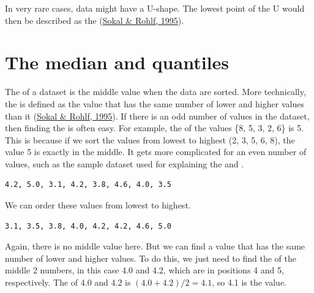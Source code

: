 \documentclass[
  openany]{krantz}
\begin{document}
In very rare cases, data might have a U-shape.
The lowest point of the U would then be described as the  (\protect\hyperlink{ref-Sokal1995}{Sokal \& Rohlf, 1995}).

\hypertarget{the-median-and-quantiles}{%
\section{The median and quantiles}\label{the-median-and-quantiles}}

The  of a dataset is the middle value when the data are sorted.
More technically, the  is defined as the value that has the same number of lower and higher values than it (\protect\hyperlink{ref-Sokal1995}{Sokal \& Rohlf, 1995}).
If there is an odd number of values in the dataset, then finding the  is often easy.
For example, the  of the values \{8, 5, 3, 2, 6\} is 5.
This is because if we sort the values from lowest to highest (2, 3, 5, 6, 8), the value 5 is exactly in the middle.
It gets more complicated for an even number of values, such as the sample dataset used for explaining the  and .

\begin{verbatim}
4.2, 5.0, 3.1, 4.2, 3.8, 4.6, 4.0, 3.5
\end{verbatim}

We can order these values from lowest to highest.

\begin{verbatim}
3.1, 3.5, 3.8, 4.0, 4.2, 4.2, 4.6, 5.0
\end{verbatim}

Again, there is no middle value here.
But we can find a value that has the same number of lower and higher values.
To do this, we just need to find the  of the middle 2 numbers, in this case 4.0 and 4.2, which are in positions 4 and 5, respectively.
The  of 4.0 and 4.2 is \((4.0 + 4.2)/2 = 4.1\), so 4.1 is the  value.
\end{document}
